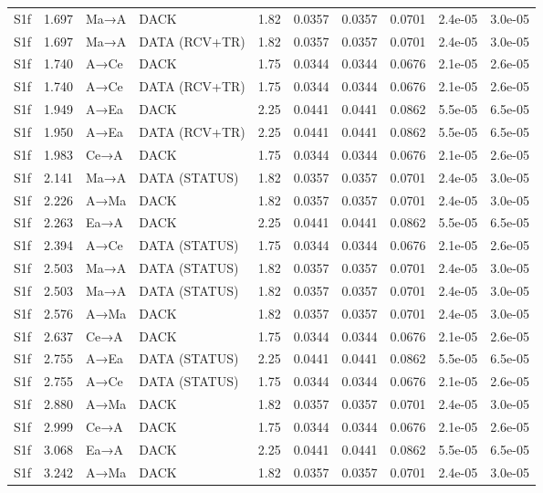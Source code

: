 \documentclass[10pt,letterpaper]{article}
\begin{document}
{\begin{longtable}{@{}lrllrrrrrr@{}}
S1f & 1.697 & Ma→A & DACK & 1.82 & 0.0357 & 0.0357 & 0.0701 & 2.4e-05 & 3.0e-05 \\
S1f & 1.697 & Ma→A & DATA (RCV+TR) & 1.82 & 0.0357 & 0.0357 & 0.0701 & 2.4e-05 & 3.0e-05 \\
S1f & 1.740 & A→Ce & DACK & 1.75 & 0.0344 & 0.0344 & 0.0676 & 2.1e-05 & 2.6e-05 \\
S1f & 1.740 & A→Ce & DATA (RCV+TR) & 1.75 & 0.0344 & 0.0344 & 0.0676 & 2.1e-05 & 2.6e-05 \\
S1f & 1.949 & A→Ea & DACK & 2.25 & 0.0441 & 0.0441 & 0.0862 & 5.5e-05 & 6.5e-05 \\
S1f & 1.950 & A→Ea & DATA (RCV+TR) & 2.25 & 0.0441 & 0.0441 & 0.0862 & 5.5e-05 & 6.5e-05 \\
S1f & 1.983 & Ce→A & DACK & 1.75 & 0.0344 & 0.0344 & 0.0676 & 2.1e-05 & 2.6e-05 \\
S1f & 2.141 & Ma→A & DATA (STATUS) & 1.82 & 0.0357 & 0.0357 & 0.0701 & 2.4e-05 & 3.0e-05 \\
S1f & 2.226 & A→Ma & DACK & 1.82 & 0.0357 & 0.0357 & 0.0701 & 2.4e-05 & 3.0e-05 \\
S1f & 2.263 & Ea→A & DACK & 2.25 & 0.0441 & 0.0441 & 0.0862 & 5.5e-05 & 6.5e-05 \\
S1f & 2.394 & A→Ce & DATA (STATUS) & 1.75 & 0.0344 & 0.0344 & 0.0676 & 2.1e-05 & 2.6e-05 \\
S1f & 2.503 & Ma→A & DATA (STATUS) & 1.82 & 0.0357 & 0.0357 & 0.0701 & 2.4e-05 & 3.0e-05 \\
S1f & 2.503 & Ma→A & DATA (STATUS) & 1.82 & 0.0357 & 0.0357 & 0.0701 & 2.4e-05 & 3.0e-05 \\
S1f & 2.576 & A→Ma & DACK & 1.82 & 0.0357 & 0.0357 & 0.0701 & 2.4e-05 & 3.0e-05 \\
S1f & 2.637 & Ce→A & DACK & 1.75 & 0.0344 & 0.0344 & 0.0676 & 2.1e-05 & 2.6e-05 \\
S1f & 2.755 & A→Ea & DATA (STATUS) & 2.25 & 0.0441 & 0.0441 & 0.0862 & 5.5e-05 & 6.5e-05 \\
S1f & 2.755 & A→Ce & DATA (STATUS) & 1.75 & 0.0344 & 0.0344 & 0.0676 & 2.1e-05 & 2.6e-05 \\
S1f & 2.880 & A→Ma & DACK & 1.82 & 0.0357 & 0.0357 & 0.0701 & 2.4e-05 & 3.0e-05 \\
S1f & 2.999 & Ce→A & DACK & 1.75 & 0.0344 & 0.0344 & 0.0676 & 2.1e-05 & 2.6e-05 \\
S1f & 3.068 & Ea→A & DACK & 2.25 & 0.0441 & 0.0441 & 0.0862 & 5.5e-05 & 6.5e-05 \\
S1f & 3.242 & A→Ma & DACK & 1.82 & 0.0357 & 0.0357 & 0.0701 & 2.4e-05 & 3.0e-05 \\

\end{longtable}}
\end{document}
